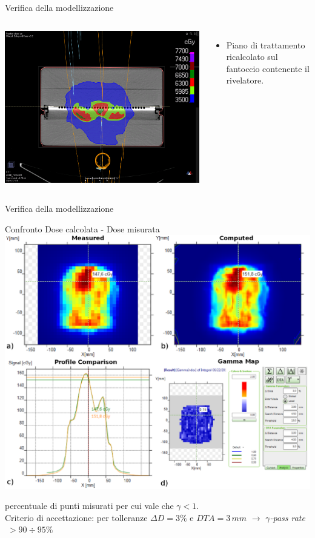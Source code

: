 \documentclass{beamer}
\begin{document}
\begin{frame}{Verifica della modellizzazione}
\begin{columns}
\centering
\includegraphics[width=.8\textwidth]{./img/Pzt_Matrixx.png}
\begin{itemize}
\tiny
\item Piano di trattamento ricalcolato sul fantoccio contenente il rivelatore.
\end{itemize}
\end{columns}
\end{frame}

\begin{frame}[t]{Verifica della modellizzazione}
\vspace{-.5cm}
\begin{center}
\footnotesize
\alert{Confronto Dose calcolata - Dose misurata}\\ \vspace{.2cm}
\includegraphics[width=.8\textwidth]{../cap2/gamma_comparison.png}
\end{center}
\vspace{-.25cm}
\scriptsize
{} percentuale di punti misurati per cui vale che $\gamma < 1$.\\ \vspace{.2cm}
{\color{Dgreen} Criterio di accettazione:} per tolleranze $\Delta D = 3\%$ e $DTA = 3\,mm$ $\rightarrow$ $\gamma$\textit{-pass rate}$\; >90\div 95\%$
\end{frame}
\end{document}
